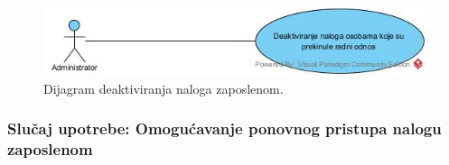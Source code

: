 \documentclass[a4paper]{article}
\begin{document}
\begin{figure} [!ht]
    \begin{center}
        \includegraphics[scale=0.5]{Korisnici/Administrator/UML/SlucajUpotrebe_DeaktiviranjeNaloga.jpg}
    \end{center}
\caption{Dijagram deaktiviranja naloga zaposlenom.}
\end{figure}

\subsubsection{Slučaj upotrebe: Omogućavanje ponovnog pristupa nalogu zaposlenom}
\end{document}

